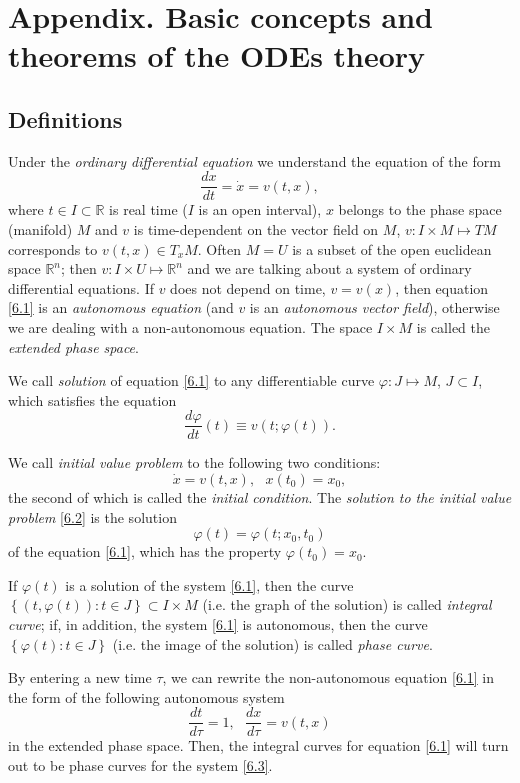 \chapter{Appendix. Basic concepts and theorems of the ODEs theory}
\section{Definitions}
Under the \emph{ordinary differential equation} we understand the equation of the form
\begin{equation}
\label{6.1}
\frac{dx}{dt}=\dot{x}=v(t,x),
\end{equation}
where $t\in I\subset \mathbb{R}$ is real time ($I$ is an open interval), $x$ belongs to the phase space (manifold) $M$ and $v$ is time-dependent on the vector field on $M$, $v:I\times M\longmapsto TM$ corresponds to $v(t,x)\in T_{x}M$. Often $M = U$ is a subset of the open euclidean space $\mathbb{R}^{n}$; then $v:I\times U\longmapsto \mathbb{R}^{n}$ and we are talking about a system of ordinary differential equations. If $v$ does not depend on time, $v = v (x)$, then equation \eqref{6.1} is an \emph{autonomous equation} (and $v$ is an \emph{autonomous vector field}), otherwise we are dealing with a non-autonomous equation. The space $I \times M$ is called the \emph{extended phase space}.

We call \emph{solution} of equation \eqref{6.1} to any differentiable curve $\varphi :J\longmapsto M$, $J\subset I$, which satisfies the equation
$$
\frac{d\varphi }{dt}(t)\equiv v(t;\varphi (t)).
$$

We call \emph{initial value problem} to the following two conditions:
\begin{equation}
\label{6.2}
\dot{x}=v(t,x),\text{ \ \ }x(t_{0})=x_{0},
\end{equation}
the second of which is called the \emph{initial condition}. The \emph{solution to the initial value problem} \eqref{6.2} is the solution
$$
\varphi (t)=\varphi (t;x_{0},t_{0})
$$
of the equation \eqref{6.1}, which has the property $\varphi (t_{0})=x_{0}.$

If $\varphi (t)$ is a solution of the system \eqref{6.1}, then the curve $\left\{ \left( t,\varphi (t)\right) :t\in J\right\} \subset I\times M$ (i.e. the graph of the solution) is called \emph{integral curve}; if, in addition, the system \eqref{6.1} is autonomous, then the curve $\left\{ \varphi (t):t\in J\right\} $ (i.e. the image of the solution) is called \emph{phase curve}.

\begin{remark}\label{remark:6.1}
	By entering a new time $\tau$, we can rewrite the non-autonomous equation \eqref{6.1} in the form of the following autonomous system
	\begin{equation}
	\label{6.3}
	\frac{dt}{d\tau }=1,\text{ \ }\frac{dx}{d\tau }=v(t,x)
	\end{equation}
	in the extended phase space. Then, the integral curves for equation \eqref{6.1} will turn out to be phase curves for the system \eqref{6.3}.
\end{remark}

